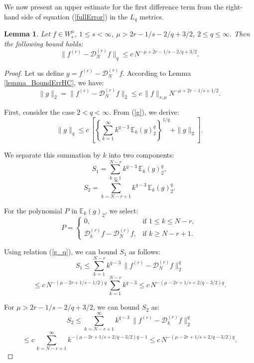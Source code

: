 \documentclass[10pt]{extarticle}
\newtheorem{lemma}[theorem]{Lemma}
\begin{document}
We now present an upper estimate for the first difference term from the right-hand side of equation (\ref{fullError}) in the $L_{q}$ metrics.

\begin{lemma}\label{lemma_Bound1_L_q}
Let $f\in W^\mu_{s}$, $1\leq s< \infty$, $\mu>2r-1/s-2/q+3/2$, $2\leq q\le \infty$.
Then the following bound holds:
$$
\|f^{(r)}-\mathcal{D}_N^{(r)} f\|_{q} \leq c\,
N^{-\mu+2r-1/s-2/q+3/2} .
$$
\end{lemma}

\begin{proof}
Let us define $g=f^{(r)}-\mathcal{D}_N^{(r)}f$. According to Lemma \ref{lemma_BoundErrHC}, we have:
\begin{equation}   \label{g_2}
\|g\|_{2} = \|f^{(r)}-\mathcal{D}_N^{(r)} f\|_{2} \leq
c\, \|f\|_{s,\mu} N^{-\mu+2r-1/s+1/2} .
\end{equation}

First, consider the case $2<q< \infty$. From (\ref{g}), we derive:
\begin{equation}  \label{g_q}
\|g\|_{q} \le c\,
\left[ \left\{\sum_{k=1}^\infty  k^{q-3}\,\mathbb{E}_k(g)_{2}^{q} \right\}^{1/q} +
\|g\|_{2}\right] .
\end{equation}

We separate this summation by $k$ into two components:
$$
S_1 = \sum_{k=1}^{N-r}  k^{q-3}\,\mathbb{E}_k(g)_{2}^{q} ,
$$
$$
S_2 = \sum_{k=N-r+1}^{\infty}  k^{q-3}\,\mathbb{E}_k(g)_{2}^{q} .
$$

For the polynomial $P$ in $\mathbb{E}_k(g)_{2}$, we select:
\begin{equation}  \label{P_k}
P = \begin{cases}
0, & \text{if } 1\le k \le N-r ,\\
\mathcal{D}_k^{(r)} f - \mathcal{D}_N^{(r)} f, & \text{if } k\ge N-r+1 .
\end{cases}
\end{equation}

Using relation (\ref{g_q}), we can bound $S_1$ as follows:
$$
S_1 \le \sum_{k=1}^{N-r}  k^{q-3}\, \|f^{(r)}-\mathcal{D}_N^{(r)} f\|_{2}^q
$$
$$
\le c\, N^{-(\mu-2r+1/s-1/2)q}\, \sum_{k=1}^{N-r}  k^{q-3}
\le c\, N^{-(\mu-2r+1/s+2/q-3/2)q} .
$$

For $\mu>2r-1/s-2/q+3/2$, we can bound $S_2$ as:
$$
S_2 \le \sum_{k=N-r+1}^{\infty}  k^{q-3}\, \|f^{(r)}-\mathcal{D}_k^{(r)} f\|_{2}^q
$$
$$
\le c\, \sum_{k=N-r+1}^{\infty}  k^{-(\mu-2r+1/s+2/q-3/2)q-1}
\le c\, N^{-(\mu-2r+1/s+2/q-3/2)q} .
$$


\end{proof}
\end{document}
